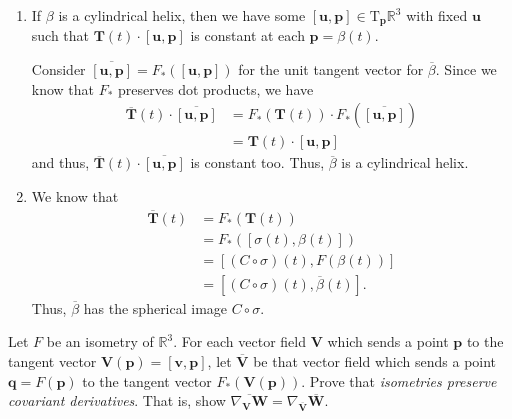 \documentclass[12 pt, letterpaper]{hmcpset}
\begin{document}
\begin{solution}
	\begin{enumerate}
		\item If $\beta$ is a cylindrical helix, then we have some $[\mathbf{u}, \mathbf{p}] \in \mathrm{T}_{\mathbf{p}}\mathbb{R}^{3}$ with fixed $\mathbf{u}$ such that $\mathbf{T}(t) \cdot [\mathbf{u}, \mathbf{p}]$ is constant at each $\mathbf{p} = \beta(t)$. 

			Consider $\overline{[\mathbf{u}, \mathbf{p}]} = F_{*}([\mathbf{u}, \mathbf{p}])$ for the unit tangent vector for $\overline{\beta}$. Since we know that $F_{*}$ preserves dot products, we have
			\[
				\begin{split}
					\overline{\mathbf{T}}(t) \cdot \overline{[\mathbf{u}, \mathbf{p}]} & = F_{*}(\mathbf{T}(t)) \cdot F_{*}(\overline{[\mathbf{u}, \mathbf{p}]}) \\
													   & = \mathbf{T}(t) \cdot [\mathbf{u}, \mathbf{p}]
				\end{split}
			\]
			and thus, $\overline{\mathbf{T}}(t) \cdot \overline{[\mathbf{u}, \mathbf{p}]}$ is constant too. Thus, $\overline{\beta}$ is a cylindrical helix.
		\item We know that
			\[
				\begin{split}
					\overline{\mathbf{T}}(t) & = F_{*}(\mathbf{T}(t)) \\
								 & = F_{*}([\sigma(t), \beta(t)]) \\
								 & = [(C \circ \sigma)(t), F(\beta(t))] \\
								 & = [(C \circ \sigma)(t), \overline{\beta}(t)].
				\end{split}
			\]
			Thus, $\overline{\beta}$ has the spherical image $C \circ \sigma$.
	\end{enumerate}
\end{solution}

\pagebreak

\begin{problem}[Problem 5.]
	Let $F$ be an isometry of $\mathbb{R}^{3}$. For each vector field $\mathbf{V}$ which sends a point $\mathbf{p}$ to the tangent vector $\mathbf{V}(\mathbf{p}) = [\mathbf{v}, \mathbf{p}]$, let $\overline{\mathbf{V}}$ be that vector field which sends a point $\mathbf{q} = F(\mathbf{p})$ to the tangent vector $F_{*}(\mathbf{V}(\mathbf{p}))$. Prove that \textit{isometries preserve covariant derivatives}. That is, show $\overline{\nabla_{\mathbf{V}} \mathbf{W}} = \nabla_{\overline{\mathbf{V}}} \overline{\mathbf{W}}$.
\end{problem}
\end{document}
